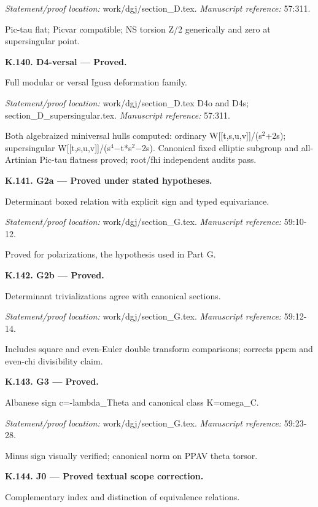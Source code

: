 \par\emph{Statement/proof location:} work/dgj/section\_D.tex.
\emph{Manuscript reference:} 57:311.
\par Pic-tau flat; Picvar compatible; NS torsion Z/2 generically and zero at supersingular point.
\par\medskip\noindent\textbf{K.140. D4-versal --- Proved.}\par
Full modular or versal Igusa deformation family.
\par\emph{Statement/proof location:} work/dgj/section\_D.tex D4o and D4s; section\_D\_supersingular.tex.
\emph{Manuscript reference:} 57:311.
\par Both algebraized miniversal hulls computed: ordinary W[[t,s,u,v]]/(s\ensuremath{{}^2}+2s); supersingular W[[t,s,u,v]]/(s\ensuremath{{}^4}−t*s\ensuremath{{}^2}−2s). Canonical fixed elliptic subgroup and all-Artinian Pic-tau flatness proved; root/fhi independent audits pass.
\par\medskip\noindent\textbf{K.141. G2a --- Proved under stated hypotheses.}\par
Determinant boxed relation with explicit sign and typed equivariance.
\par\emph{Statement/proof location:} work/dgj/section\_G.tex.
\emph{Manuscript reference:} 59:10-12.
\par Proved for polarizations, the hypothesis used in Part G.
\par\medskip\noindent\textbf{K.142. G2b --- Proved.}\par
Determinant trivializations agree with canonical sections.
\par\emph{Statement/proof location:} work/dgj/section\_G.tex.
\emph{Manuscript reference:} 59:12-14.
\par Includes square and even-Euler double transform comparisons; corrects ppcm and even-chi divisibility claim.
\par\medskip\noindent\textbf{K.143. G3 --- Proved.}\par
Albanese sign c=-lambda\_Theta and canonical class K=omega\_C.
\par\emph{Statement/proof location:} work/dgj/section\_G.tex.
\emph{Manuscript reference:} 59:23-28.
\par Minus sign visually verified; canonical norm on PPAV theta torsor.
\par\medskip\noindent\textbf{K.144. J0 --- Proved textual scope correction.}\par
Complementary index and distinction of equivalence relations.
